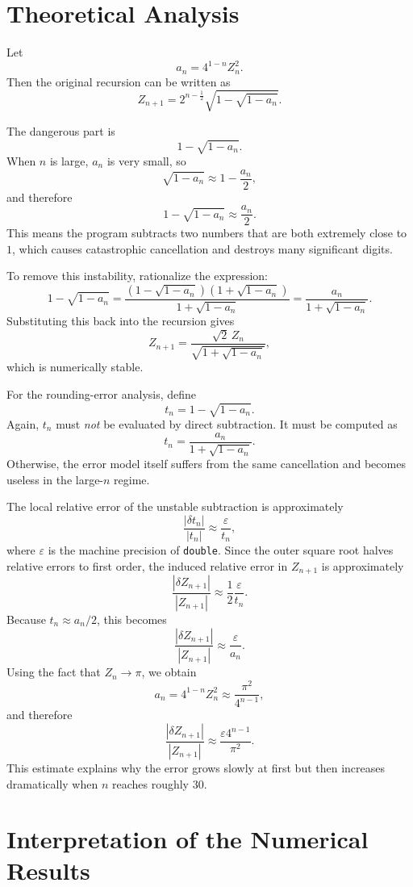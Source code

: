 \documentclass[12pt,a4paper]{article}
\begin{document}
\section{Theoretical Analysis}

Let
\[
a_n = 4^{1-n} Z_n^2.
\]
Then the original recursion can be written as
\[
Z_{n+1} = 2^{n-\frac12}\sqrt{1-\sqrt{1-a_n}}.
\]

The dangerous part is
\[
1-\sqrt{1-a_n}.
\]
When $n$ is large, $a_n$ is very small, so
\[
\sqrt{1-a_n} \approx 1 - \frac{a_n}{2},
\]
and therefore
\[
1-\sqrt{1-a_n} \approx \frac{a_n}{2}.
\]
This means the program subtracts two numbers that are both extremely close to $1$, which causes catastrophic cancellation and destroys many significant digits.

To remove this instability, rationalize the expression:
\[
1-\sqrt{1-a_n}
= \frac{(1-\sqrt{1-a_n})(1+\sqrt{1-a_n})}{1+\sqrt{1-a_n}}
= \frac{a_n}{1+\sqrt{1-a_n}}.
\]
Substituting this back into the recursion gives
\[
Z_{n+1}
= \frac{\sqrt{2}\,Z_n}{\sqrt{1+\sqrt{1-a_n}}},
\]
which is numerically stable.

For the rounding-error analysis, define
\[
t_n = 1 - \sqrt{1-a_n}.
\]
Again, $t_n$ must \emph{not} be evaluated by direct subtraction. It must be computed as
\[
t_n = \frac{a_n}{1+\sqrt{1-a_n}}.
\]
Otherwise, the error model itself suffers from the same cancellation and becomes useless in the large-$n$ regime.

The local relative error of the unstable subtraction is approximately
\[
\frac{|\delta t_n|}{|t_n|} \approx \frac{\varepsilon}{t_n},
\]
where $\varepsilon$ is the machine precision of \texttt{double}. Since the outer square root halves relative errors to first order, the induced relative error in $Z_{n+1}$ is approximately
\[
\frac{|\delta Z_{n+1}|}{|Z_{n+1}|} \approx \frac{1}{2}\frac{\varepsilon}{t_n}.
\]
Because $t_n \approx a_n/2$, this becomes
\[
\frac{|\delta Z_{n+1}|}{|Z_{n+1}|} \approx \frac{\varepsilon}{a_n}.
\]
Using the fact that $Z_n \to \pi$, we obtain
\[
a_n = 4^{1-n} Z_n^2 \approx \frac{\pi^2}{4^{n-1}},
\]
and therefore
\[
\boxed{
\frac{|\delta Z_{n+1}|}{|Z_{n+1}|}
\approx
\frac{\varepsilon 4^{n-1}}{\pi^2}
}.
\]
This estimate explains why the error grows slowly at first but then increases dramatically when $n$ reaches roughly $30$.

\section{Interpretation of the Numerical Results}
\end{document}
